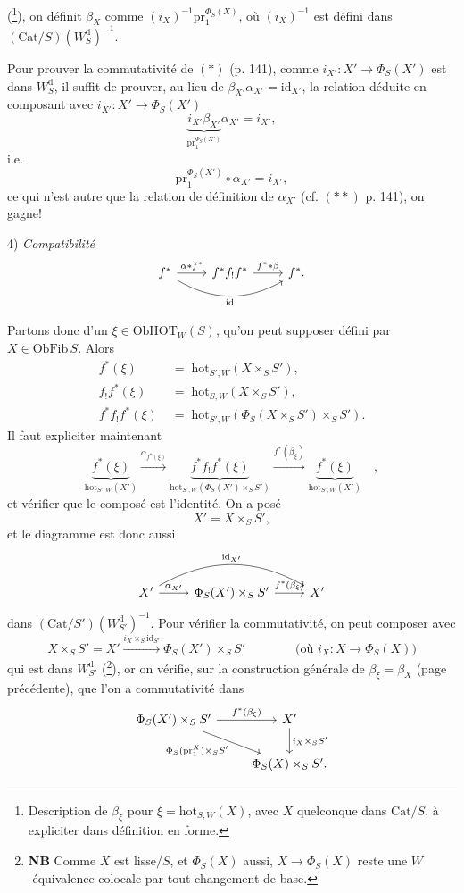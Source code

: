 \documentclass[11pt]{article}
\newcommand{\printedpage}[1]{\marginpar{\footnotesize p.~#1}}
\newcommand{\msp}[1]{\marginpar{\footnotesize [#1]}}
\newcommand{\HOT}{\mathrm{HOT}}
\newcommand{\hot}{\mathrm{hot}}
\newcommand{\Cat}{\mathrm{Cat}}
\newcommand{\id}{\mathrm{id}}
\newcommand{\pr}{\mathrm{pr}}
\newcommand{\Ob}{\mathrm{Ob}}
\newcommand{\Wd}{W^{\mathrm{d}}}
\begin{document}
(\footnote[70]{Description de $\beta_\xi$ pour $\xi=\hot_{S,W}(X)$, avec $X$ quelconque dans $\Cat/S$, à expliciter dans définition en forme.}), on définit $\beta_X$ comme $(i_X)^{-1}\pr_1^{\Phi_S(X)}$, où $(i_X)^{-1}$ est défini dans $(\Cat/S)(\Wd_S)^{-1}$.

Pour prouver la commutativité de $(*)$ (p. 141), comme $i_{X'} : X'\longrightarrow\Phi_S(X')$ est dans $\Wd_S$, il suffit de prouver, au lieu de $\beta_{X'}\alpha_{X'} = \id_{X'}$, la relation déduite en composant avec $i_{X'} : X'\longrightarrow\Phi_S(X')$
\[
\underbrace{i_{X'}\beta_{X'}}_{\pr_1^{\Phi_S(X')}}\alpha_{X'} = i_{X'},
\]
i.e.
\[
\pr_1^{\Phi_S(X')}\circ\alpha_{X'} = i_{X'},
\]
ce qui n'est autre que la relation de définition de $\alpha_{X'}$ (cf. $(**)$ p. 141), on gagne!

4) \textit{Compatibilité}
\[
\begin{tikzcd}
f^* \arrow[r, "\alpha*f^*"] \arrow[rr, bend right, "\id"'] & f^*f_!f^* \arrow[r, "f^**\beta"] & f^*.
\end{tikzcd}
\]

\printedpage{88}
\leavevmode\msp{page 144}Partons donc d'un $\xi\in\Ob\HOT_W(S)$, qu'on peut supposer défini par $X\in\Ob\underline{\mathrm{Fib}}\,S$. Alors
\[
\begin{aligned}
f^*(\xi) &\;=\; \hot_{S',W}(X\times_S S'),\\
f_!f^*(\xi) &\;=\; \hot_{S,W}(X\times_S S'),\\
f^*f_!f^*(\xi) &\;=\; \hot_{S',W}(\Phi_S(X\times_S S')\times_S S').
\end{aligned}
\]
Il faut expliciter maintenant
\[
\underbrace{f^*(\xi)}_{\hot_{S',W}(X')} \xrightarrow{\alpha_{f^*(\xi)}} \underbrace{f^*f_!f^*(\xi)}_{\hot_{S',W}(\Phi_S(X')\times_S S')} \xrightarrow{f^*(\beta_\xi)} \underbrace{f^*(\xi)}_{\hot_{S',W}(X')} \quad ,
\]
et vérifier que le composé est l'identité. On a posé
\[
X' = X\times_S S',
\]
et le diagramme est donc aussi
\[
\begin{tikzcd}
X' \arrow[r, "{\alpha_{X'}}"] \arrow[rr, bend left, "{\id_{X'}}"] & \Phi_S(X')\times_S S' \arrow[r, "f^*(\beta_\xi)"] & X' %
\end{tikzcd}
\]
dans $(\Cat/S')(\Wd_{S'})^{-1}$. Pour vérifier la commutativité, on peut composer avec
\[
X\times_S S' = X' \xrightarrow{i_X\times_S\id_{S'}} \Phi_S(X')\times_S S' \qquad\qquad \text{(où } i_X : X\longrightarrow\Phi_S(X)\text{)}
\]
qui est dans $\Wd_{S'}$ (\footnote[71]{\textbf{NB} Comme $X$ est lisse$/S$, et $\Phi_S(X)$ aussi, $X\longrightarrow\Phi_S(X)$ reste une $W$-équivalence colocale par tout changement de base.}), or on vérifie, sur la construction générale de $\beta_\xi=\beta_X$ (page précédente), que l'on a commutativité dans
\[
\begin{tikzcd}
\Phi_S(X')\times_S S' \arrow[r, "f^*(\beta_\xi)"] \arrow[dr, "\Phi_S(\pr_1^X)\times_S S'"'] & X' \arrow[d, "i_X\times_S S'"] \\
 & \Phi_S(X)\times_S S'.
\end{tikzcd}
\]
\end{document}
